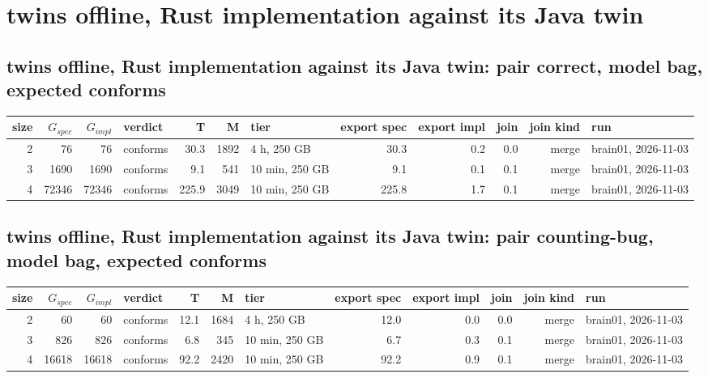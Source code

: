 \documentclass[10pt]{article}
\begin{document}
\section*{twins offline, Rust implementation against its Java twin}
\subsection*{twins offline, Rust implementation against its Java twin: pair \textsf{correct}, model bag, expected conforms}
\begin{longtable}{@{}rrrlrrlrrrrl@{}}
\toprule
size & $G_{\mathit{spec}}$ & $G_{\mathit{impl}}$ & verdict & T & M & tier & export spec & export impl & join & join kind & run \\
\midrule
\endhead
\color{blue} 2 & 76 & 76 & conforms & 30.3 & 1892 & 4 h, 250 GB & 30.3 & 0.2 & 0.0 & merge & brain01, 2026-11-03 \\
\color{blue} 3 & 1690 & 1690 & conforms & 9.1 & 541 & 10 min, 250 GB & 9.1 & 0.1 & 0.1 & merge & brain01, 2026-11-03 \\
\color{blue} 4 & 72346 & 72346 & conforms & 225.9 & 3049 & 10 min, 250 GB & 225.8 & 1.7 & 0.1 & merge & brain01, 2026-11-03 \\
\bottomrule
\end{longtable}
\subsection*{twins offline, Rust implementation against its Java twin: pair \textsf{counting-bug}, model bag, expected conforms}
\begin{longtable}{@{}rrrlrrlrrrrl@{}}
\toprule
size & $G_{\mathit{spec}}$ & $G_{\mathit{impl}}$ & verdict & T & M & tier & export spec & export impl & join & join kind & run \\
\midrule
\endhead
\color{blue} 2 & 60 & 60 & conforms & 12.1 & 1684 & 4 h, 250 GB & 12.0 & 0.0 & 0.0 & merge & brain01, 2026-11-03 \\
\color{blue} 3 & 826 & 826 & conforms & 6.8 & 345 & 10 min, 250 GB & 6.7 & 0.3 & 0.1 & merge & brain01, 2026-11-03 \\
\color{blue} 4 & 16618 & 16618 & conforms & 92.2 & 2420 & 10 min, 250 GB & 92.2 & 0.9 & 0.1 & merge & brain01, 2026-11-03 \\
\bottomrule
\end{longtable}
\end{document}
